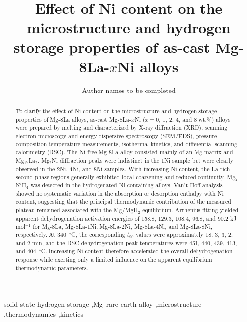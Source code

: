 \documentclass[preprint,12pt]{elsarticle}
\begin{document}
\begin{frontmatter}
\title{Effect of Ni content on the microstructure and hydrogen storage properties of as-cast Mg-8La-$x$Ni alloys}
\author[aff1]{Author names to be completed}

\begin{abstract}
To clarify the effect of Ni content on the microstructure and hydrogen storage properties of Mg-8La alloys, as-cast Mg-8La-$x$Ni ($x=0$, 1, 2, 4, and 8 wt.\%) alloys were prepared by melting and characterized by X-ray diffraction (XRD), scanning electron microscopy and energy-dispersive spectroscopy (SEM/EDS), pressure-composition-temperature measurements, isothermal kinetics, and differential scanning calorimetry (DSC). The Ni-free Mg-8La alloy consisted mainly of an Mg matrix and Mg$_{17}$La$_2$. Mg$_2$Ni diffraction peaks were indistinct in the 1Ni sample but were clearly observed in the 2Ni, 4Ni, and 8Ni samples. With increasing Ni content, the La-rich second-phase regions generally exhibited local coarsening and reduced continuity. Mg$_2$NiH$_4$ was detected in the hydrogenated Ni-containing alloys. Van't Hoff analysis showed no systematic variation in the absorption or desorption enthalpy with Ni content, suggesting that the principal thermodynamic contribution of the measured plateau remained associated with the Mg/MgH$_2$ equilibrium. Arrhenius fitting yielded apparent dehydrogenation activation energies of 158.8, 129.3, 108.4, 96.8, and 90.2 kJ mol$^{-1}$ for Mg-8La, Mg-8La-1Ni, Mg-8La-2Ni, Mg-8La-4Ni, and Mg-8La-8Ni, respectively. At 340~$^{\circ}$C, the corresponding $t_{90}$ values were approximately 18, 3, 3, 2, and 2 min, and the DSC dehydrogenation peak temperatures were 451, 440, 439, 413, and 404~$^{\circ}$C. Increasing Ni content therefore accelerated the overall dehydrogenation response while exerting only a limited influence on the apparent equilibrium thermodynamic parameters.
\end{abstract}
\begin{keyword}
solid-state hydrogen storage \sep Mg--rare-earth alloy \sep microstructure \sep thermodynamics \sep kinetics
\end{keyword}
\end{frontmatter}

\nocite{ref1,ref2,ref3,ref4,ref5,ref6,ref7,ref8,ref9,ref10,ref11,ref12,ref13,ref14,ref15,ref16,ref17,ref18,ref19,ref20}
\end{document}
